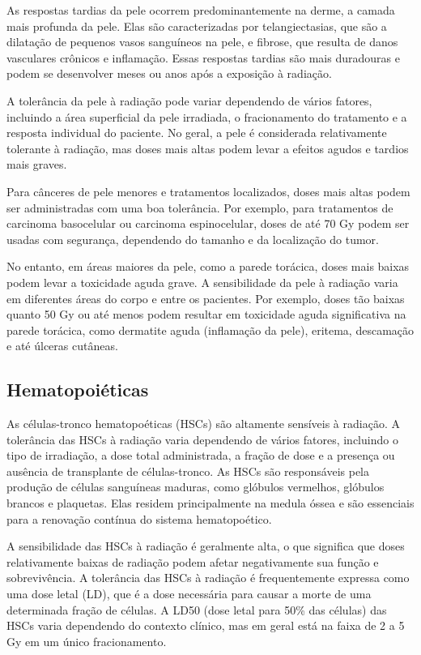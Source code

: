 \documentclass[11pt,a4paper]{article}
\newcounter{exemplo}
\begin{document}
	As respostas tardias da pele ocorrem predominantemente na derme, a camada mais profunda da pele. Elas são caracterizadas por telangiectasias, que são a dilatação de pequenos vasos sanguíneos na pele, e fibrose, que resulta de danos vasculares crônicos e inflamação. Essas respostas tardias são mais duradouras e podem se desenvolver meses ou anos após a exposição à radiação.

	A tolerância da pele à radiação pode variar dependendo de vários fatores, incluindo a área superficial da pele irradiada, o fracionamento do tratamento e a resposta individual do paciente. No geral, a pele é considerada relativamente tolerante à radiação, mas doses mais altas podem levar a efeitos agudos e tardios mais graves.

	Para cânceres de pele menores e tratamentos localizados, doses mais altas podem ser administradas com uma boa tolerância. Por exemplo, para tratamentos de carcinoma basocelular ou carcinoma espinocelular, doses de até 70 Gy podem ser usadas com segurança, dependendo do tamanho e da localização do tumor.

	No entanto, em áreas maiores da pele, como a parede torácica, doses mais baixas podem levar a toxicidade aguda grave. A sensibilidade da pele à radiação varia em diferentes áreas do corpo e entre os pacientes. Por exemplo, doses tão baixas quanto 50 Gy ou até menos podem resultar em toxicidade aguda significativa na parede torácica, como dermatite aguda (inflamação da pele), eritema, descamação e até úlceras cutâneas.

\subsection*{Hematopoiéticas}

	As células-tronco hematopoéticas (HSCs) são altamente sensíveis à radiação. A tolerância das HSCs à radiação varia dependendo de vários fatores, incluindo o tipo de irradiação, a dose total administrada, a fração de dose e a presença ou ausência de transplante de células-tronco.	As HSCs são responsáveis pela produção de células sanguíneas maduras, como glóbulos vermelhos, glóbulos brancos e plaquetas. Elas residem principalmente na medula óssea e são essenciais para a renovação contínua do sistema hematopoético.

	A sensibilidade das HSCs à radiação é geralmente alta, o que significa que doses relativamente baixas de radiação podem afetar negativamente sua função e sobrevivência. A tolerância das HSCs à radiação é frequentemente expressa como uma dose letal (LD), que é a dose necessária para causar a morte de uma determinada fração de células. A LD50 (dose letal para 50\% das células) das HSCs varia dependendo do contexto clínico, mas em geral está na faixa de 2 a 5 Gy em um único fracionamento.
\end{document}
